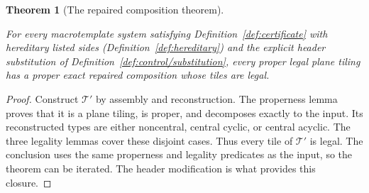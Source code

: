 \documentclass[11pt,a4paper]{article}
\newtheorem{theorem}[definition]{Theorem}
\theoremstyle{remark}
\newcommand{\lean}[1]{}
\newcommand{\uses}[1]{}
\begin{document}
\begin{theorem}[The repaired composition theorem]
\label{thm:compose}
\lean{Tilings.Planned.compose_legal_exists}
\uses{def:certificate,def:hereditary,lem:comp/proper,lem:comp/noncentral-legal,lem:comp/cyclic-legal,lem:comp/acyclic-legal}
For every macrotemplate system satisfying Definition~\ref{def:certificate}
with hereditary listed sides (Definition~\ref{def:hereditary})
and the explicit header substitution of Definition~\ref{def:control/substitution},
every proper legal plane tiling has a proper exact repaired composition
whose tiles are legal.
\end{theorem}
\begin{proof}
Construct $\mathcal T'$ by assembly and reconstruction. The properness
lemma proves that it is a plane tiling, is proper, and decomposes exactly
to the input. Its reconstructed types are either noncentral, central cyclic,
or central acyclic. The three legality lemmas cover these disjoint cases.
Thus every tile of $\mathcal T'$ is legal. The conclusion uses the same
properness and legality predicates as the input, so the theorem can be
iterated. The header modification is what provides this closure.
\end{proof}
\end{document}
